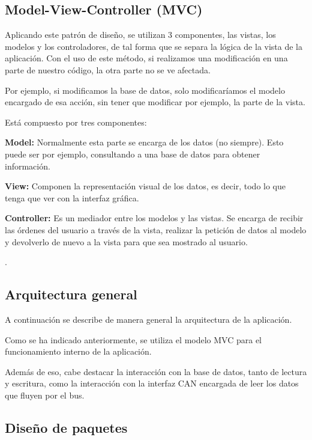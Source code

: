 \subsection{Model-View-Controller (MVC)}

Aplicando este patrón de diseño, se utilizan 3 componentes, las vistas, los modelos y los controladores, de tal forma que se separa la lógica de la vista de la aplicación. Con el uso de este método, si realizamos una modificación en una parte de nuestro código, la otra parte no se ve afectada.

Por ejemplo, si modificamos la base de datos, solo modificaríamos el modelo encargado de esa acción, sin tener que modificar por ejemplo, la parte de la vista.

Está compuesto por tres componentes:

\textbf{Model:} Normalmente esta parte se encarga de los datos (no siempre). Esto puede ser por ejemplo, consultando a una base de datos para obtener información.

\textbf{View:} Componen la representación visual de los datos, es decir, todo lo que tenga que ver con la interfaz gráfica.

\textbf{Controller:} Es un mediador entre los modelos y las vistas. Se encarga de recibir las órdenes del usuario a través de la vista, realizar la petición de datos al modelo y devolverlo de nuevo a la vista para que sea mostrado al usuario.

.

\subsection{Arquitectura general}

A continuación se describe de manera general la arquitectura de la aplicación.

Como se ha indicado anteriormente, se utiliza el modelo MVC para el funcionamiento interno de la aplicación.

Además de eso, cabe destacar la interacción con la base de datos, tanto de lectura y escritura, como la interacción con la interfaz CAN encargada de leer los datos que fluyen por el bus.


\subsection{Diseño de paquetes}

